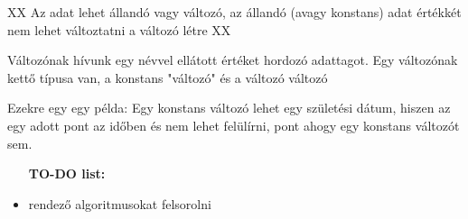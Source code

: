 \documentclass[12pt, a4paper]{article}
\begin{document}
XX Az adat lehet állandó vagy változó, az állandó (avagy konstans) adat értékkét nem lehet változtatni a változó létre XX

Változónak hívunk egy névvel ellátott értéket hordozó adattagot. Egy változónak kettő típusa van, a konstans "változó" és a változó változó

Ezekre egy egy példa:
Egy konstans változó lehet egy születési dátum, hiszen az egy adott pont az időben és nem lehet felülírni, pont ahogy egy konstans változót sem.


\begin{itemize}

    \item [\textbf{TO-DO list:}]
    \item rendező algoritmusokat felsorolni

\end{itemize}
\end{document}
